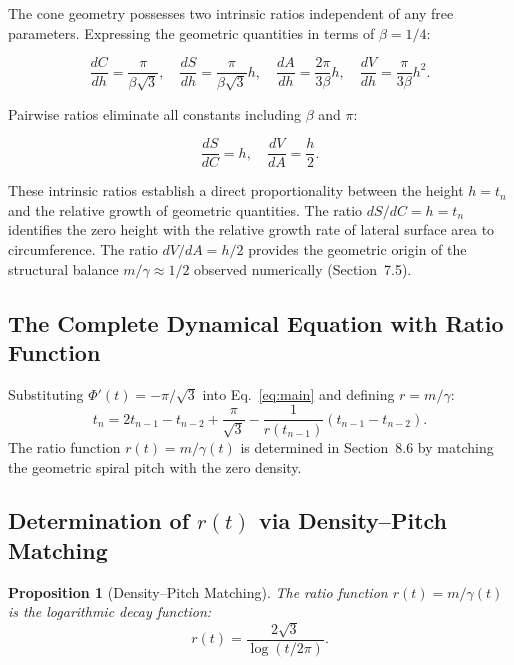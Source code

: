 \documentclass[12pt,a4paper]{article}
\newtheorem{proposition}[theorem]{Proposition}
\begin{document}
The cone geometry possesses two intrinsic ratios independent of any free parameters. Expressing the geometric quantities in terms of $\beta = 1/4$:

\begin{equation}
\frac{dC}{dh} = \frac{\pi}{\beta\sqrt{3}}, \quad \frac{dS}{dh} = \frac{\pi}{\beta\sqrt{3}}h, \quad \frac{dA}{dh} = \frac{2\pi}{3\beta}h, \quad \frac{dV}{dh} = \frac{\pi}{3\beta}h^2.
\end{equation}

Pairwise ratios eliminate all constants including $\beta$ and $\pi$:

\begin{equation}
\boxed{\frac{dS}{dC} = h, \quad \frac{dV}{dA} = \frac{h}{2}}.
\end{equation}

These intrinsic ratios establish a direct proportionality between the height $h = t_n$ and the relative growth of geometric quantities. The ratio $dS/dC = h = t_n$ identifies the zero height with the relative growth rate of lateral surface area to circumference. The ratio $dV/dA = h/2$ provides the geometric origin of the structural balance $m/\gamma \approx 1/2$ observed numerically (Section~7.5).

\subsection{The Complete Dynamical Equation with Ratio Function}

Substituting $\Phi'(t) = -\pi/\sqrt{3}$ into Eq.~\eqref{eq:main} and defining $r = m/\gamma$:
\begin{equation}
t_n = 2t_{n-1} - t_{n-2} + \frac{\pi}{\sqrt{3}} - \frac{1}{r(t_{n-1})}(t_{n-1} - t_{n-2}).
\end{equation}
The ratio function $r(t) = m/\gamma(t)$ is determined in Section~8.6 by matching the geometric spiral pitch with the zero density.

\subsection{Determination of $r(t)$ via Density--Pitch Matching}
\label{sec:density-pitch}

\begin{proposition}[Density--Pitch Matching]
\label{prop:r-function}
The ratio function $r(t) = m/\gamma(t)$ is the logarithmic decay function:
\begin{equation}
r(t) = \frac{2\sqrt{3}}{\log(t/2\pi)}.
\end{equation}
\end{proposition}
\end{document}
